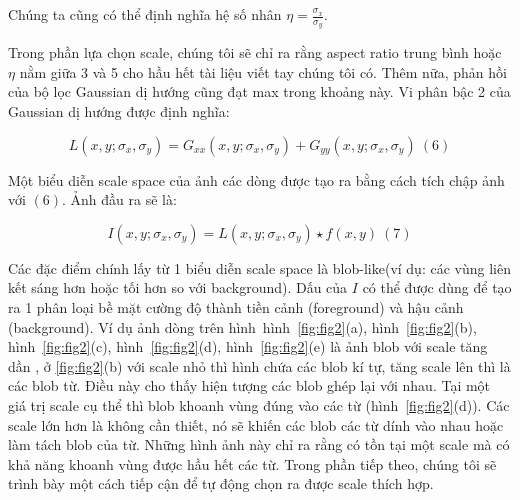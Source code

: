 \documentclass[a4paper]{article}
\begin{document}
Chúng ta cũng có thể định nghĩa hệ số nhân $\eta = \frac {\sigma_x}{\sigma_y}$.

Trong phần lựa chọn scale, chúng tôi sẽ chỉ ra rằng aspect ratio trung bình hoặc $\eta$  nằm giữa 3 và 5 cho hầu hết tài liệu viết tay chúng tôi có. Thêm nữa, phản hồi của bộ lọc Gaussian dị hướng cũng đạt max trong khoảng này. Vi phân bậc 2 của Gaussian dị hướng được định nghĩa:

\begin{equation}
    L(x, y; \sigma_x,\sigma_y) = G_{xx}(x, y; \sigma_x, \sigma_y) + G_{yy}(x, y; \sigma_x, \sigma_y) ~(6)
\end{equation}

Một biểu diễn scale space của ảnh các dòng được tạo ra bằng cách tích chập ảnh với $(6)$. Ảnh đầu ra sẽ là:

\begin{equation}
    I(x, y; \sigma_x, \sigma_y) = L(x, y; \sigma_x, \sigma_y) \star f(x, y)~(7)
\end{equation}

Các đặc điểm chính lấy từ 1 biểu diễn scale space là blob-like(ví dụ: các vùng liên kết sáng hơn hoặc tối hơn so với background). Dấu của $I$ có thể được dùng để tạo ra 1 phân loại bề mặt cường độ thành tiền cảnh (foreground) và hậu cảnh (background). Ví dụ ảnh dòng trên hình~hình~\ref{fig:fig2}(a), hình~\ref{fig:fig2}(b), hình~\ref{fig:fig2}(c), hình~\ref{fig:fig2}(d), hình~\ref{fig:fig2}(e) là ảnh blob với scale tăng dần , ở \ref{fig:fig2}(b) với scale nhỏ thì hình chứa các blob kí tự, tăng scale lên thì là các blob từ. Điều này cho thấy hiện tượng các blob ghép lại với nhau. Tại một giá trị scale cụ thể thì blob khoanh vùng đúng vào các từ (hình~\ref{fig:fig2}(d)). Các scale lớn hơn là không cần thiết, nó sẽ khiến các blob các từ dính vào nhau hoặc làm tách blob của từ. Những hình ảnh này chỉ ra rằng có tồn tại một scale mà có khả năng khoanh vùng được hầu hết các từ. Trong phần tiếp theo, chúng tôi sẽ trình bày một cách tiếp cận để tự động chọn ra được scale thích hợp.
\end{document}
